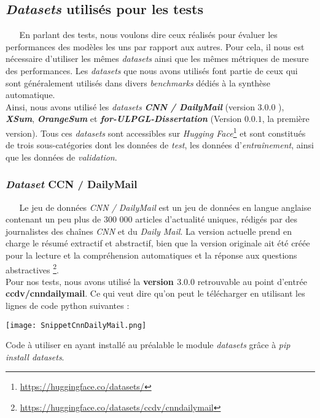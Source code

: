 \subsection{\textit{Datasets} utilisés pour les tests}
$ _{} $ $ _{} $ $ _{} $ $ _{} $ $ _{} $En parlant des tests, nous voulons dire ceux réalisés pour évaluer les performances des modèles les uns par rapport aux autres. Pour cela, il nous est nécessaire d'utiliser les mêmes \textit{datasets} ainsi que les mêmes métriques de mesure des performances. Les \textit{datasets} que nous avons utilisés font partie de ceux qui sont généralement utilisés dans divers \textit{benchmarks} dédiés à la synthèse automatique.\\
Ainsi, nous avons utilisé les \textit{datasets} \textit{\textbf{CNN / DailyMail}} (version $ 3.0.0 $ ), \textit{\textbf{XSum}}, \textit{\textbf{OrangeSum}} et \textit{\textbf{for-ULPGL-Dissertation}} (Version $ 0.0.1 $, la première version). Tous ces \textit{datasets} sont accessibles sur \textit{Hugging Face}\footnote{\href{https://huggingface.co/datasets/}{https://huggingface.co/datasets/}} et sont constitués de trois sous-catégories dont les données de \textit{test}, les données d'\textit{entraînement}, ainsi que les données de \textit{validation}.
\subsubsection{\textit{Dataset} CCN / DailyMail}
$ _{} $ $ _{} $ $ _{} $ $ _{} $ $ _{} $Le jeu de données \textit{CNN / DailyMail} est un jeu de données en langue anglaise contenant un peu plus de 300 000 articles d'actualité uniques, rédigés par des journalistes des chaînes \textit{CNN} et du \textit{Daily Mail}. La version actuelle prend en charge le résumé extractif et abstractif, bien que la version originale ait été créée pour la lecture et la compréhension automatiques et la réponse aux questions abstractives \footnote{\href{https://huggingface.co/datasets/ccdv/cnn\textunderscore dailymail}{https://huggingface.co/datasets/ccdv/cnn\textunderscore dailymail}}.\\
Pour nos tests, nous avons utilisé la \textbf{version $ 3.0.0 $} retrouvable au point d'entrée\\ \textbf{ccdv/cnn\textunderscore dailymail}. Ce qui veut dire qu'on peut le télécharger en utilisant les lignes de code python suivantes :
\begin{center}
\texttt{[image: SnippetCnnDailyMail.png]}
\end{center}
Code à utiliser en ayant installé au préalable le module \textit{datasets} grâce à \textit{pip install datasets}.
